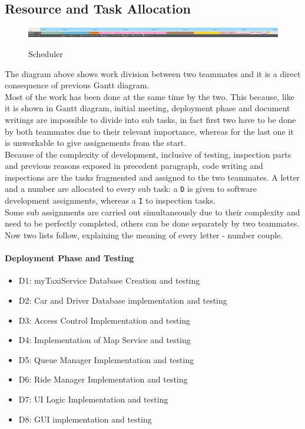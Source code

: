 \newpage
\begin{landscape}
\section{Resource and Task Allocation}
\begin{figure}[H]
\centering
\includegraphics[scale=0.25]{DiagramSources/Scheduler.png}
\label{Fig 2: }\caption{Scheduler}
\end{figure}
\end{landscape}
The diagram above shows work division between two teammates and it is a direct consequence of previous Gantt diagram. \\
Most of the work has been done at the same time by the two. This because, like it is shown in Gantt diagram, initial meeting, deployment phase and document writings are impossible to divide into sub tasks, in fact first two have to be done by both teammates due to their relevant importance, whereas for the last one it is unworkable to give assignements from the start.\\
Because of the complexity of development, inclusive of testing, inspection parts and previous reasons exposed in precedent paragraph, code writing and inspections are the tasks fragmented and assigned to the two teammates. A letter and a number are allocated to every sub task: a \texttt{D} is given to software development assignments, whereas a \texttt{I} to inspection tasks.\\
Some sub assignments are carried out simultaneously due to their complexity and need to be perfectly completed, others can be done separately by two teammates. \\
Now two lists follow, explaining the meaning of every letter - number couple.
\paragraph{Deployment Phase and Testing}
\begin{itemize}
\item D1: myTaxiService Database Creation and testing
\item D2: Car and Driver Database implementation and testing 
\item D3: Access Control Implementation and testing
\item D4: Implementation of Map Service and testing
\item D5: Queue Manager Implementation and testing
\item D6: Ride Manager Implementation and testing
\item D7: UI Logic Implementation and testing
\item D8: GUI implementation and testing
\end{itemize}  
